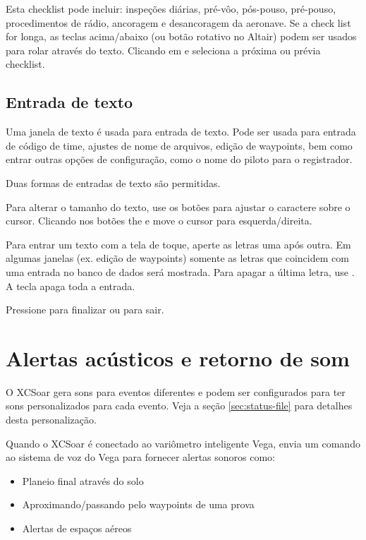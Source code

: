 Esta checklist pode incluir: inspeções diárias, pré-vôo, pós-pouso, pré-pouso, procedimentos de rádio, ancoragem e desancoragem da aeronave.
Se a check list for longa, as teclas acima/abaixo (ou botão rotativo no Altair) podem ser usados para rolar através do texto.  Clicando em \bmenuw{$<$} e \bmenuw{$>$} seleciona a próxima ou prévia checklist.



\subsection*{Entrada de texto} \label{sec:textentry}

Uma janela de texto é usada para entrada de texto.  Pode ser usada para entrada de código de time, ajustes de nome de arquivos, edição de waypoints, bem como entrar outras opções de configuração, como o nome do piloto para o registrador.

Duas formas de entradas de texto são permitidas.  

Para alterar o tamanho do texto, use os botões 
para ajustar o caractere sobre o cursor. Clicando nos botões the \button{$<$} 
e \button{$>$} move o cursor para esquerda/direita.  

Para entrar um texto com a tela de toque, aperte as letras uma após outra.  Em algumas janelas (ex. edição de waypoints) somente as letras que coincidem com uma entrada no banco de dados será mostrada.  Para apagar a última letra, use\button{$<-$} . A tecla  apaga toda a entrada.

Pressione  para finalizar ou  para sair. 



\section{Alertas acústicos e retorno de som}

O XCSoar gera sons para eventos diferentes e podem ser configurados para ter sons personalizados para cada evento.  Veja a seção \ref{sec:status-file} para detalhes desta personalização.

Quando o XCSoar é conectado ao variômetro inteligente Vega, envia um comando ao sistema de voz do Vega para fornecer alertas sonoros como:

\begin{itemize}
\item Planeio final através do solo
\item Aproximando/passando pelo waypoints de uma prova
\item Alertas de espaços aéreos
\end{itemize}

